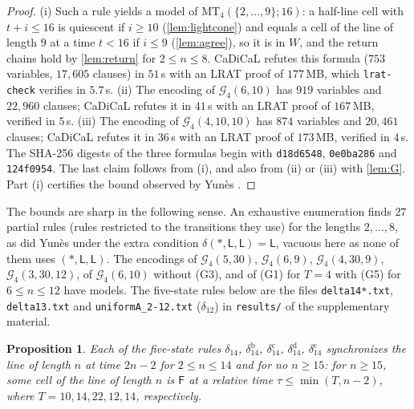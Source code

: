\documentclass[3p]{elsarticle}
\newtheorem{proposition}[theorem]{Proposition}
\theoremstyle{definition}
\newcommand{\Lq}{\mathsf L}
\newcommand{\Fq}{\mathsf F}
\newcommand{\G}{\mathcal G}
\begin{document}
\begin{proof}
(i) Such a rule yields a model of $\mathrm{MT}_4(\{2,\dots,9\};16)$: a
half-line cell with $t+i\le16$ is quiescent if $i\ge10$
(\cref{lem:lightcone}) and equals a cell of the line of length $9$ at a time
$t<16$ if $i\le9$ (\cref{lem:agree}), so it is in $W$, and the return chains
hold by \cref{lem:return} for $2\le n\le8$. CaDiCaL refutes this formula
($753$ variables, $17{,}605$ clauses) in $51$\,s with an LRAT proof of
$177$\,MB, which \texttt{lrat-check} verifies in $5.7$\,s. (ii) The encoding
of $\G_4(6,10)$ has $919$ variables and $22{,}960$ clauses; CaDiCaL refutes it
in $41$\,s with an LRAT proof of $167$\,MB, verified in $5$\,s. (iii) The
encoding of $\G_4(4,10,10)$ has $874$ variables and $20{,}461$ clauses;
CaDiCaL refutes it in $36$\,s with an LRAT proof of $173$\,MB, verified in
$4$\,s. The SHA-256 digests of the three formulas begin with
\texttt{d18d6548}, \texttt{0e0ba286} and \texttt{124f0954}. The last claim
follows from (i), and also from (ii) or (iii) with \cref{lem:G}. Part (i)
certifies the bound observed by Yun\`es \cite{Yunes93}.
\end{proof}

The bounds are sharp in the following sense. An exhaustive enumeration finds
$27$ partial rules (rules restricted to the transitions they use) for the
lengths $2,\dots,8$, as did Yun\`es \cite{Yunes93} under the extra condition
$\delta(\ast,\Lq,\Lq)=\Lq$, vacuous here as none of them uses $(\ast,\Lq,\Lq)$. The encodings of $\G_4(5,30)$, $\G_4(6,9)$, $\G_4(4,30,9)$,
$\G_4(3,30,12)$, of $\G_4(6,10)$ without (G3), and of (G1) for $T=4$ with (G5)
for $6\le n\le12$ have models. The five-state rules below are the files
\texttt{delta14*.txt}, \texttt{delta13.txt} and \texttt{uniformA\_2-12.txt}
($\delta_{12}$) in \texttt{results/} of the supplementary material.

\begin{proposition}\label{prop:nearmiss}
Each of the five-state rules $\delta_{14}$, $\delta_{14}^{\mathrm b}$,
$\delta_{14}^{\mathrm c}$, $\delta_{14}^{\mathrm d}$, $\delta_{14}^{\mathrm e}$
synchronizes the line of length $n$ at time $2n-2$ for $2\le n\le14$ and for
no $n\ge15$: for $n\ge15$, some cell of the line of length $n$ is $\Fq$ at a
relative time $\tau\le\min(T,n-2)$, where $T=10,14,22,12,14$, respectively.
\end{proposition}
\end{document}
